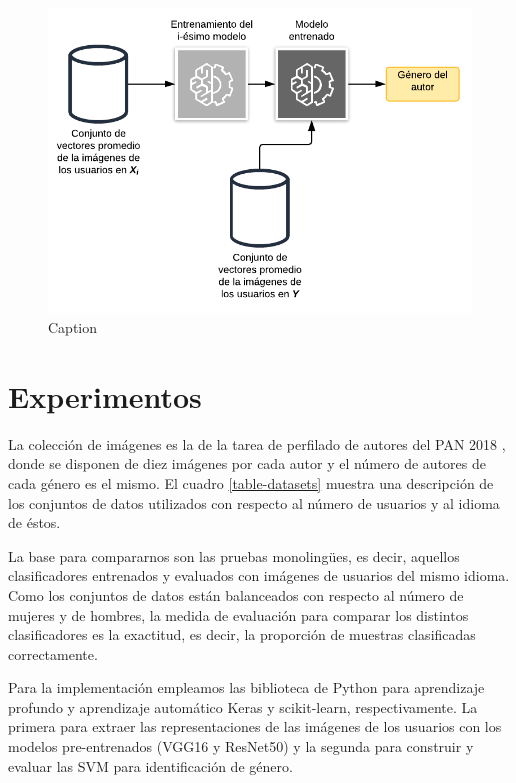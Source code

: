 \documentclass[runningheads]{llncs}
\begin{document}
\begin{figure}[!h]
    \centering
    \includegraphics[scale=0.3]{img/classifier_scheme.png}
    \caption{Caption}
    \label{fig:classifier}
\end{figure}


\section{Experimentos}

La colección de imágenes es la de la tarea de perfilado de autores del PAN 2018
\cite{rangel_rosso_montes-y-gomez_potthast_stein}, donde se disponen de diez imágenes por cada autor y el número de autores de cada género es el mismo. El cuadro \ref{table-datasets}
muestra una descripción de los conjuntos de datos utilizados con respecto al número
de usuarios y al idioma de éstos.

La base para compararnos son las pruebas monolingües, es decir, aquellos
clasificadores entrenados y evaluados con imágenes de usuarios del mismo idioma.
Como los conjuntos de datos están balanceados con respecto al número de mujeres
y de hombres, la medida de evaluación para comparar los distintos clasificadores
es la exactitud, es decir, la proporción de muestras clasificadas correctamente.


Para la implementación empleamos las biblioteca de Python para aprendizaje 
profundo y aprendizaje automático Keras y scikit-learn, respectivamente. La primera
para extraer las representaciones de las imágenes de los usuarios con los modelos
pre-entrenados (VGG16 y ResNet50) y la segunda para construir y evaluar las SVM
para identificación de género. 
\end{document}
